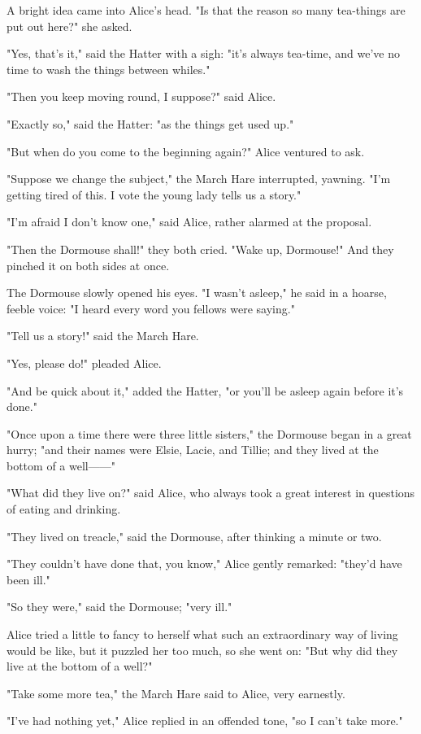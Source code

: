 A bright idea came into Alice's head. "Is that the reason so many tea-things are put out here?" she asked.

"Yes, that's it," said the Hatter with a sigh: "it's always tea-time, and we've no time to wash the things between whiles."

"Then you keep moving round, I suppose?" said Alice.

"Exactly so," said the Hatter: "as the things get used up."

"But when do you come to the beginning again?" Alice ventured to ask.

​"Suppose we change the subject," the March Hare interrupted, yawning. "I'm getting tired of this. I vote the young lady tells us a story."

"I'm afraid I don't know one," said Alice, rather alarmed at the proposal.

"Then the Dormouse shall!" they both cried. "Wake up, Dormouse!" And they pinched it on both sides at once.

The Dormouse slowly opened his eyes. "I wasn't asleep," he said in a hoarse, feeble voice: "I heard every word you fellows were saying."

"Tell us a story!" said the March Hare.

"Yes, please do!" pleaded Alice.

"And be quick about it," added the Hatter, "or you'll be asleep again before it's done."

"Once upon a time there were three little sisters," the Dormouse began in a great hurry; "and their names were Elsie, Lacie, and Tillie; and they lived at the bottom of a well——"

"What did they live on?" said Alice, who always took a great interest in questions of eating and drinking.

​"They lived on treacle," said the Dormouse, after thinking a minute or two.

"They couldn't have done that, you know," Alice gently remarked: "they'd have been ill."

"So they were," said the Dormouse; "very ill."

Alice tried a little to fancy to herself what such an extraordinary way of living would be like, but it puzzled her too much, so she went on: "But why did they live at the bottom of a well?"

"Take some more tea," the March Hare said to Alice, very earnestly.

"I've had nothing yet," Alice replied in an offended tone, "so I can't take more."

